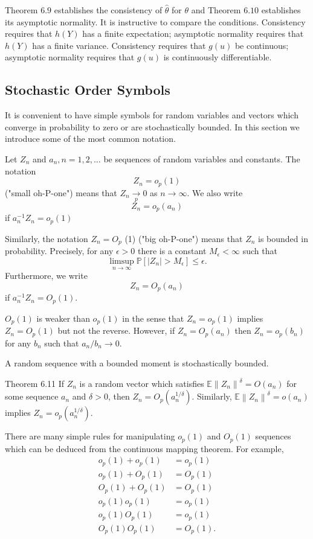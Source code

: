 \documentclass[10pt]{article}
\begin{document}
Theorem $6.9$ establishes the consistency of $\widehat{\theta}$ for $\theta$ and Theorem $6.10$ establishes its asymptotic normality. It is instructive to compare the conditions. Consistency requires that $h(Y)$ has a finite expectation; asymptotic normality requires that $h(Y)$ has a finite variance. Consistency requires that $g(u)$ be continuous; asymptotic normality requires that $g(u)$ is continuously differentiable.

\subsection{Stochastic Order Symbols}
It is convenient to have simple symbols for random variables and vectors which converge in probability to zero or are stochastically bounded. In this section we introduce some of the most common notation.

Let $Z_{n}$ and $a_{n}, n=1,2, \ldots$ be sequences of random variables and constants. The notation
$$
Z_{n}=o_{p}(1)
$$
("small oh-P-one") means that $Z_{n} \underset{p}{\longrightarrow} 0$ as $n \rightarrow \infty$. We also write
$$
Z_{n}=o_{p}\left(a_{n}\right)
$$
if $a_{n}^{-1} Z_{n}=o_{p}(1)$

Similarly, the notation $Z_{n}=O_{p}$ (1) ("big oh-P-one") means that $Z_{n}$ is bounded in probability. Precisely, for any $\epsilon>0$ there is a constant $M_{\epsilon}<\infty$ such that
$$
\limsup _{n \rightarrow \infty} \mathbb{P}\left[\left|Z_{n}\right|>M_{\epsilon}\right] \leq \epsilon .
$$
Furthermore, we write
$$
Z_{n}=O_{p}\left(a_{n}\right)
$$
if $a_{n}^{-1} Z_{n}=O_{p}(1)$.

$O_{p}(1)$ is weaker than $o_{p}(1)$ in the sense that $Z_{n}=o_{p}(1)$ implies $Z_{n}=O_{p}(1)$ but not the reverse. However, if $Z_{n}=O_{p}\left(a_{n}\right)$ then $Z_{n}=o_{p}\left(b_{n}\right)$ for any $b_{n}$ such that $a_{n} / b_{n} \rightarrow 0$.

A random sequence with a bounded moment is stochastically bounded.

Theorem 6.11 If $Z_{n}$ is a random vector which satisfies $\mathbb{E}\left\|Z_{n}\right\|^{\delta}=O\left(a_{n}\right)$ for some sequence $a_{n}$ and $\delta>0$, then $Z_{n}=O_{p}\left(a_{n}^{1 / \delta}\right)$. Similarly, $\mathbb{E}\left\|Z_{n}\right\|^{\delta}=o\left(a_{n}\right)$ implies $Z_{n}=o_{p}\left(a_{n}^{1 / \delta}\right)$.

There are many simple rules for manipulating $o_{p}(1)$ and $O_{p}(1)$ sequences which can be deduced from the continuous mapping theorem. For example,
$$
\begin{aligned}
o_{p}(1)+o_{p}(1) &=o_{p}(1) \\
o_{p}(1)+O_{p}(1) &=O_{p}(1) \\
O_{p}(1)+O_{p}(1) &=O_{p}(1) \\
o_{p}(1) o_{p}(1) &=o_{p}(1) \\
o_{p}(1) O_{p}(1) &=o_{p}(1) \\
O_{p}(1) O_{p}(1) &=O_{p}(1) .
\end{aligned}
$$
\end{document}
